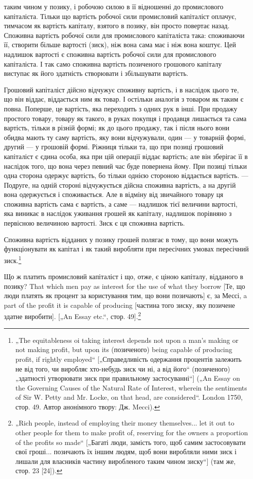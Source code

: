 таким чином у позику, і робочою силою в її відношенні до промислового
капіталіста. Тільки що вартість робочої сили промисловий
капіталіст оплачує, тимчасом як вартість капіталу, взятого
в позику, він просто повертає назад. Споживна вартість робочої
сили для промислового капіталіста така: споживаючи її, створити
більше вартості (зиск), ніж вона сама має і ніж вона коштує.
Цей надлишок вартості є споживна вартість робочої сили для
промислового капіталіста. І так само споживна вартість позиченого
грошового капіталу виступає як його здатність створювати
і збільшувати вартість.

Грошовий капіталіст дійсно відчужує споживну вартість, і в наслідок
цього те, що він віддає, віддається ним як товар. І остільки
аналогія з товаром як таким є повна. Поперше, це вартість, яка
переходить з одних рук в інші. При продажу простого товару,
товару як такого, в руках покупця і продавця лишається та сама
вартість, тільки в різній формі; як до цього продажу, так і після
нього вони обидва мають ту саму вартість, яку вони відчужували,
один — у товарній формі, другий — у грошовій формі. Ріжниця
тільки та, що при позиці грошовий капіталіст є єдина особа, яка
при цій операції віддає вартість; але він зберігає її в наслідок того,
що вона через певний час буде повернена йому. При позиці тільки
одна сторона одержує вартість, бо тільки однією стороною віддається
вартість. — Подруге, на одній стороні відчужується дійсна
споживна вартість, а на другій вона одержується і споживається.
Але в відміну від звичайного товару ця споживна вартість сама є
вартість, а саме — надлишок тієї величини вартості, яка виникає
в наслідок уживання грошей як капіталу, надлишок порівняно з
первісною величиною вартості. Зиск є ця споживна вартість.

Споживна вартість відданих у позику грошей полягає в тому,
що вони можуть функціонувати як капітал і як такий виробляти
при пересічних умовах пересічний зиск.\footnote{
„The equitableness oi taking interest depends not upon a man’s making or
not making profit, but upon its (позиченого) being capable of producing profit, if
rightly employed“ [„Справедливість одержання процентів залежить не від того, чи
виробляє хто-небудь зиск чи ні, а від його“ (позиченого) „здатності утворювати
зиск при правильному застосуванні“] („An Essay on the Governing Causes of
the Natural Rate of Interest, wherein the sentiments of Sir W. Petty and
Mr. Locke, on that head, are considered“. London 1750, стор. 49. Автор анонімного
твору: Дж. Mecci).
}

Що ж платить промисловий капіталіст і що, отже, є ціною
капіталу, відданого в позику? That which men pay as interest for
the use of what they borrow [Те, що люди платять як процент за
користування тим, що вони позичають] є, за Мессі, a part of the
profit it is capable of producing [частина того зиску, яку позичене
здатне виробити]. [„An Essay etc.“, стор. 49].\footnote{
„Rich people, instead of employing their money themselves... let it out to
other people for them to make profit of, reserving for the owners a proportion of
the profits so made“ [„Багаті люди, замість того, щоб самим застосовувати свої
гроші... позичають їх іншим людям, щоб вони виробляли ними зиск і лишали для
власників частину виробленого таким чином зиску“] (там же, стор. 23 [24]).
}